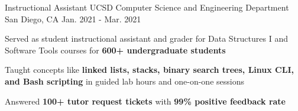 \begin{cventries}
  \cventry
    {Instructional Assistant} %
    {UCSD Computer Science and Engineering Department} %
    {San Diego, CA} %
    {Jan. 2021 - Mar. 2021} %
    {
      \begin{cvitems} %
        \item {Served as student instructional assistant and grader for Data Structures I and Software Tools courses for \textbf{600+ undergraduate students}}
        \item {Taught concepts like \textbf{linked lists, stacks, binary search trees, Linux CLI, and Bash scripting} in guided lab hours and one-on-one sessions}
        \item {Answered \textbf{100+ tutor request tickets} with \textbf{99\% positive feedback rate}}
      \end{cvitems}
    }




\end{cventries}
